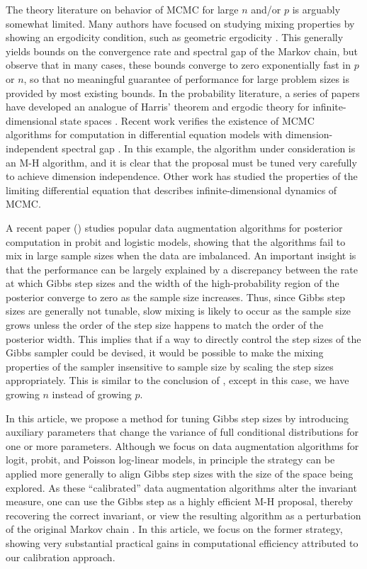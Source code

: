 \documentclass[12pt]{article}
\begin{document}
The theory literature on behavior of MCMC for large $n$ and/or $p$ is arguably somewhat limited. Many authors have focused on studying mixing properties by showing 
an ergodicity condition, such as geometric ergodicity \citep{roberts2004general,meyn2012markov}. This generally yields bounds on the convergence rate and spectral gap of the Markov chain, but \cite{rajaratnam2015mcmc} observe that in many cases, these bounds converge to zero exponentially fast in $p$ or $n$, so that no meaningful guarantee of performance for large problem sizes is provided by most existing bounds. In the probability literature, a series of papers have developed an analogue of Harris' theorem and ergodic theory for infinite-dimensional state spaces \citep{hairer2011asymptotic}. Recent work verifies the existence of MCMC algorithms for computation in differential equation models with dimension-independent spectral gap \citep{hairer2014spectral}. In this example, the algorithm under consideration is an M-H algorithm, and it is clear that the proposal must be tuned very carefully to achieve dimension independence. Other work has studied the properties of the limiting differential equation that describes infinite-dimensional dynamics of MCMC.

A recent paper (\cite{johndrow2016inefficiency}) studies popular data augmentation algorithms for posterior computation in probit \citep{albert1993bayesian} and logistic  \citep{polson2013bayesian} models, showing that the algorithms fail to mix in large sample sizes when the data are imbalanced. An important insight is that the performance can be largely explained by a discrepancy between the rate at which Gibbs step sizes and the width of the high-probability region of the posterior converge to zero as the sample size increases. Thus, since Gibbs step sizes are generally not tunable, slow mixing is likely to occur as the sample size grows unless the order of the step size happens to match the order of the posterior width. This implies that if a way to directly control the step sizes of the Gibbs sampler could be devised, it would be possible to make the mixing properties of the sampler insensitive to sample size by scaling the step sizes appropriately. This is similar to the conclusion of \cite{hairer2014spectral}, except in this case, we have growing $n$ instead of growing $p$.

In this article, we propose a method for tuning Gibbs step sizes by introducing auxiliary parameters that change the variance of full conditional distributions for one or more parameters. Although we focus on data augmentation algorithms for logit, probit, and Poisson log-linear models, in principle the strategy can be applied more generally to align Gibbs step sizes with the size of the space being explored. As these ``calibrated'' data augmentation algorithms alter the invariant measure, one can use the Gibbs step as a highly efficient M-H proposal, thereby recovering the correct invariant, or view the resulting algorithm as a perturbation of the original Markov chain \citep{tran2016adaptive}. In this article, we focus on the former strategy, showing very substantial practical gains in computational efficiency attributed to our calibration approach.
\end{document}
